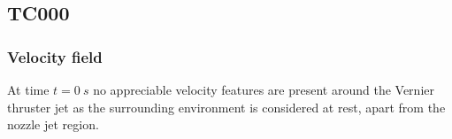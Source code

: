 \documentclass[12pt]{article}
\begin{document}

\subsection{TC000}\label{sec:TC000}

\subsubsection*{Velocity field}
At time $t=0~s$ no appreciable velocity features are present around the Vernier thruster jet as the surrounding environment is considered at rest, apart from the nozzle jet region.
\end{document}
